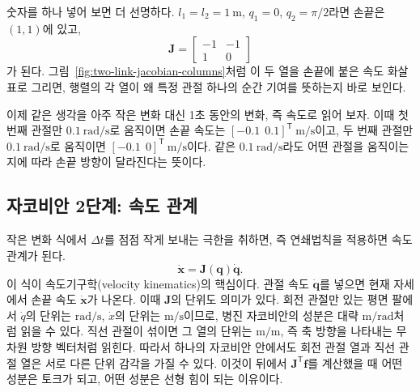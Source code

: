 숫자를 하나 넣어 보면 더 선명하다.
\(l_1=l_2=1~\mathrm{m}\), \(q_1=0\), \(q_2=\pi/2\)라면 손끝은 \((1,1)\)에 있고,
\[
  \bm{J}
  =
  \begin{bmatrix}
    -1 & -1 \\
     1 &  0
  \end{bmatrix}
\]
가 된다.
그림~\ref{fig:two-link-jacobian-columns}처럼 이 두 열을 손끝에 붙은 속도 화살표로 그리면, 행렬의 각 열이 왜 특정 관절 하나의 순간 기여를 뜻하는지 바로 보인다.



이제 같은 생각을 아주 작은 변화 대신 1초 동안의 변화, 즉 속도로 읽어 보자.
이때 첫 번째 관절만 \(0.1~\mathrm{rad/s}\)로 움직이면 손끝 속도는 \([-0.1\ \ 0.1]^{\mathsf{T}}~\mathrm{m/s}\)이고, 두 번째 관절만 \(0.1~\mathrm{rad/s}\)로 움직이면 \([-0.1\ \ 0]^{\mathsf{T}}~\mathrm{m/s}\)이다.
같은 \(0.1~\mathrm{rad/s}\)라도 어떤 관절을 움직이는지에 따라 손끝 방향이 달라진다는 뜻이다.

\subsection{자코비안 2단계: 속도 관계}
\label{sec:robotics-velocity-kinematics}

작은 변화 식에서 \(\Delta t\)를 점점 작게 보내는 극한을 취하면, 즉 연쇄법칙을 적용하면 속도 관계가 된다.
\begin{equation}
  \dot{\bm{x}}
  =
  \bm{J}(\bm{q})\dot{\bm{q}}.
  \label{eq:jacobian-velocity-foundation}
\end{equation}
이 식이 속도기구학(velocity kinematics)의 핵심이다.
관절 속도 \(\dot{\bm{q}}\)를 넣으면 현재 자세에서 손끝 속도 \(\dot{\bm{x}}\)가 나온다.
이때 \(\bm{J}\)의 단위도 의미가 있다.
회전 관절만 있는 평면 팔에서 \(\dot{q}\)의 단위는 \(\mathrm{rad/s}\), \(\dot{x}\)의 단위는 \(\mathrm{m/s}\)이므로, 병진 자코비안의 성분은 대략 \(\mathrm{m/rad}\)처럼 읽을 수 있다.
직선 관절이 섞이면 그 열의 단위는 \(\mathrm{m/m}\), 즉 축 방향을 나타내는 무차원 방향 벡터처럼 읽힌다.
따라서 하나의 자코비안 안에서도 회전 관절 열과 직선 관절 열은 서로 다른 단위 감각을 가질 수 있다.
이것이 뒤에서 \(\bm{J}^{\mathsf{T}}\bm{f}\)를 계산했을 때 어떤 성분은 토크가 되고, 어떤 성분은 선형 힘이 되는 이유이다.

